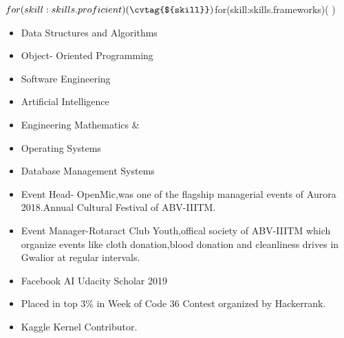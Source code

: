 








${for(skill:skills.proficient)(
  \cvtag{${skill}}
)}
${for(skill:skills.frameworks)(
)}


\medskip
{}

\begin{itemize}
    \item Data Structures and Algorithms
    \item Object- Oriented Programming
    \item Software Engineering
    \item Artificial Intelligence
    \item Engineering Mathematics  \& 
    \item Operating Systems
    \item Database Management Systems
\end{itemize}

\begin{itemize}
    \item Event Head- OpenMic,was one of the flagship managerial events of Aurora 2018.Annual Cultural Festival of ABV-IIITM. 
    \item Event Manager-Rotaract Club Youth,offical society of ABV-IIITM which organize events like cloth donation,blood donation and cleanliness drives in Gwalior at regular intervals.  
\end{itemize}
\smallskip
\begin{itemize}
\item Facebook AI Udacity Scholar 2019

\item Placed in top 3\% in Week of Code 36 Contest organized by Hackerrank.
\item Kaggle Kernel Contributor.

\end{itemize}